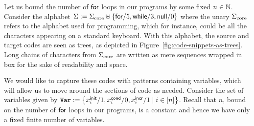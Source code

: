 Let us bound the number of $\mathsf{for}$ loops in our programs by some fixed $n \in \mathbb{N}$. Consider the alphabet $\Sigma := \Sigma_\text{core} \uplus \left\{ \mathsf{for}/5, \mathsf{while}/3, \mathsf{null}/0 \right\}$ where the unary $\Sigma_\text{core}$ refers to the alphabet used for programming, which for instance, could be all the characters appearing on a standard keyboard. With this alphabet, the source and target codes are seen as trees, as depicted in Figure~\ref{fig:code-snippets-as-trees}. Long chains of characters from $\Sigma_\text{core}$ are written as mere sequences wrapped in box for the sake of readability and space. 


We would like to capture these codes with  patterns  containing variables, which will allow us to move around the  sections of code as needed.  Consider the set of variables given by $\texttt{Var} := \left\{ x^{\mathsf{init}}_i/1, x^{\mathsf{cond}}_i/0, x^{\mathsf{incr}}_i/1 \mid i \in [n] \right\}$. Recall that $n$, bound on the number of $\mathsf{for}$ loops in our programs, is a constant and hence we have only a fixed finite number of variables. 

